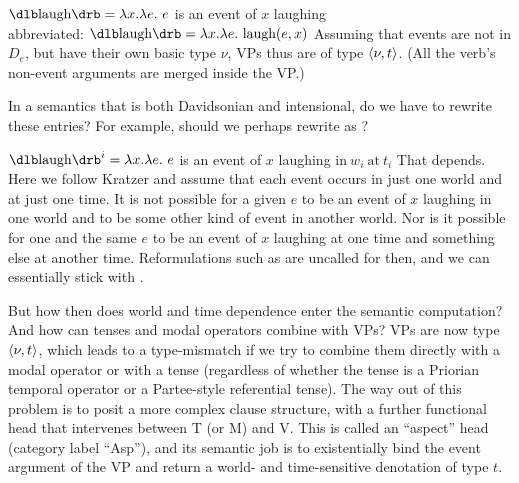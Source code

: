 \ex $\svt{laugh} = \lambda x.\lambda e.\ e$ is an event of $x$ laughing\\
abbreviated: $\svt{laugh} = \lambda x.\lambda e.\ \text{laugh}(e,x)$
\label{ex:laugh}\xe
%
Assuming that events are not in $D_{e}$, but have their own basic type $\nu$,
VPs thus are of type $\langle \nu,t \rangle$. (All the verb's non-event arguments are
merged inside the VP.)

In a semantics that is both Davidsonian and intensional, do we have to rewrite
these entries? For example, should we perhaps rewrite \Last as \Next?

\ex $\svt{laugh}^{i} = \lambda x.\lambda e.\ e$ is an event of $x$ laughing
$\boxed{\text{in}\ w_{i}\ \text{at}\ t_{i}}$\label{ex:laugh-i} \xe
%
That depends. Here we follow Kratzer and assume that each event occurs in just
one world and at just one time. %
%
It is not possible for a given $e$ to be an event of $x$ laughing in one world
and to be some other kind of event in another world. Nor is it possible for one
and the same $e$ to be an event of $x$ laughing at one time and something else
at another time. %
%
Reformulations such as  are uncalled for then, and we can
essentially stick with .

But how then does world and time dependence enter the semantic computation? And
how can tenses and modal operators combine with VPs? VPs are now type $\langle \nu,t \rangle$,
which leads to a type-mismatch if we try to combine them directly with a modal
operator or with a tense (regardless of whether the tense is a Priorian temporal
operator or a Partee-style referential tense). The way out of this problem is to
posit a more complex clause structure, with a further functional head that
intervenes between T (or M) and V. This is called an ``aspect'' head (category
label ``Asp''), and its semantic job is to existentially bind the event argument
of the VP and return a world- and time-sensitive denotation of type $t$.


